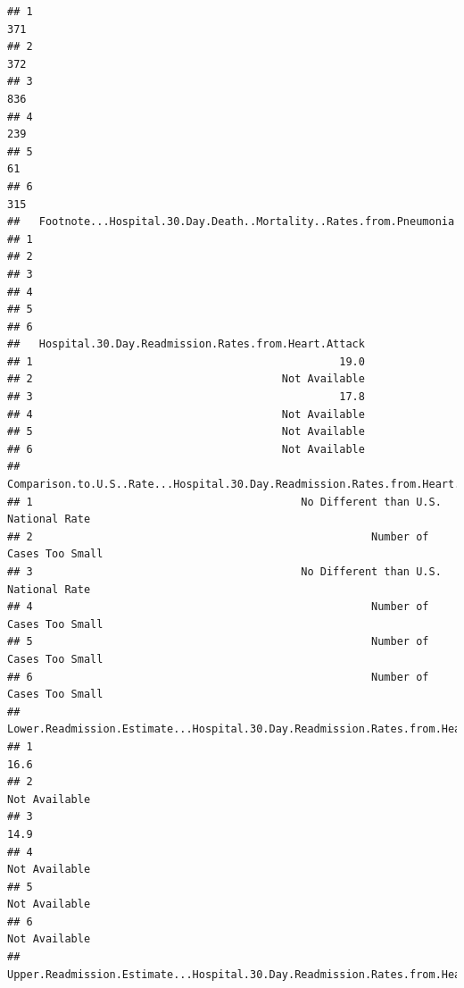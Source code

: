 \documentclass[
]{article}
\begin{document}
\begin{verbatim}
## 1                                                                         371
## 2                                                                         372
## 3                                                                         836
## 4                                                                         239
## 5                                                                          61
## 6                                                                         315
##   Footnote...Hospital.30.Day.Death..Mortality..Rates.from.Pneumonia
## 1                                                                  
## 2                                                                  
## 3                                                                  
## 4                                                                  
## 5                                                                  
## 6                                                                  
##   Hospital.30.Day.Readmission.Rates.from.Heart.Attack
## 1                                                19.0
## 2                                       Not Available
## 3                                                17.8
## 4                                       Not Available
## 5                                       Not Available
## 6                                       Not Available
##   Comparison.to.U.S..Rate...Hospital.30.Day.Readmission.Rates.from.Heart.Attack
## 1                                          No Different than U.S. National Rate
## 2                                                     Number of Cases Too Small
## 3                                          No Different than U.S. National Rate
## 4                                                     Number of Cases Too Small
## 5                                                     Number of Cases Too Small
## 6                                                     Number of Cases Too Small
##   Lower.Readmission.Estimate...Hospital.30.Day.Readmission.Rates.from.Heart.Attack
## 1                                                                             16.6
## 2                                                                    Not Available
## 3                                                                             14.9
## 4                                                                    Not Available
## 5                                                                    Not Available
## 6                                                                    Not Available
##   Upper.Readmission.Estimate...Hospital.30.Day.Readmission.Rates.from.Heart.Attack

\end{verbatim}
\end{document}
